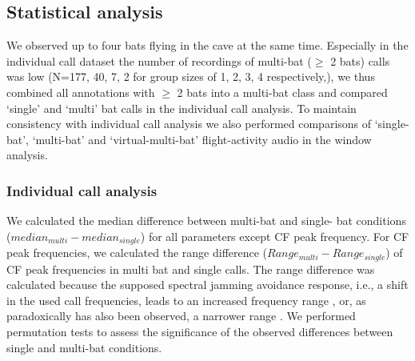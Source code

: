 \documentclass[
]{book}
\begin{document}
\hypertarget{statistical-analysis}{%
\subsection{Statistical analysis}\label{statistical-analysis}}

We observed up to four bats flying in the cave at the same time. Especially in the individual call dataset the number of recordings of multi-bat (\(\geq\) 2 bats) calls was low (N=177, 40, 7, 2 for group sizes of 1, 2, 3, 4 respectively,), we thus combined all annotations with \(\geq\) 2 bats into a multi-bat class and compared `single' and `multi' bat calls in the individual call analysis. To maintain consistency with individual call analysis we also performed comparisons of `single-bat', `multi-bat' and `virtual-multi-bat' flight-activity audio in the window analysis.

\hypertarget{indcallstatanalysis}{%
\subsubsection{Individual call analysis}\label{indcallstatanalysis}}

We calculated the median difference between multi-bat and single- bat conditions (\(median_{multi}-median_{single}\)) for all parameters except CF peak frequency. For CF peak frequencies, we calculated the range difference (\(Range_{multi}-Range_{single}\)) of CF peak frequencies in multi bat and single calls. The range difference was calculated because the supposed spectral jamming avoidance response, i.e., a shift in the used call frequencies, leads to an increased frequency range \citep{habersetzer1981a}, or, as paradoxically has also been observed, a narrower range \citep{furusawa2012convergence}. We performed permutation tests to assess the significance of the observed differences between single and multi-bat conditions.
\end{document}

